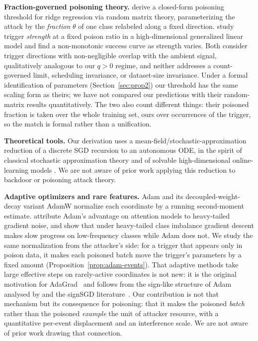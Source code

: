 \documentclass{article} %
\begin{document}
\textbf{Fraction-governed poisoning theory.} \citet{linearpoisoning2025} derive a
closed-form poisoning threshold for ridge regression via random matrix theory,
parameterizing the attack by the \emph{fraction} $\theta$ of one class relabeled along a
fixed direction. \citet{glmbackdoor2026} study trigger \emph{strength} at a fixed
poison ratio in a high-dimensional generalized linear model and find a non-monotonic
success curve as strength varies. Both consider trigger directions with non-negligible
overlap with the ambient signal, qualitatively analogous to our $q>0$ regime, and
neither addresses a count-governed limit, scheduling invariance, or dataset-size
invariance. Under a formal identification of parameters (Section~\ref{sec:prop2}) our threshold has the same scaling form as theirs; we have not compared our predictions with their random-matrix results quantitatively. The two also count different things: their poisoned fraction is taken over the whole training set, ours over occurrences of the trigger, so the match is formal rather than a unification.

\textbf{Theoretical tools.} Our derivation uses a mean-field/stochastic-approximation
reduction of a discrete SGD recursion to an autonomous ODE, in the spirit of classical
stochastic approximation theory \citep{robbinsmonro1951,benveniste1990} and of
solvable high-dimensional online-learning models
\citep{goldt2019dynamics,benarous2021online}. We are not aware of prior work applying
this reduction to backdoor or poisoning attack theory.

\textbf{Adaptive optimizers and rare features.} Adam \citep{kingma2015adam} and its
decoupled-weight-decay variant AdamW \citep{loshchilov2019adamw} normalize each
coordinate by a running second-moment estimate. \citet{zhang2020adaptive} attribute
Adam's advantage on attention models to heavy-tailed gradient noise, and
\citet{kunstner2024heavytailed} show that under heavy-tailed class imbalance gradient
descent makes slow progress on low-frequency classes while Adam does not. We study the
same normalization from the attacker's side: for a trigger that appears only in poison
data, it makes each poisoned batch move the trigger's parameters by a fixed amount
(Proposition~\ref{prop:adam-events}). That adaptive methods take large effective steps on rarely-active coordinates is not
new: it is the original motivation for AdaGrad~\citep{duchi2011adagrad} and follows from
the sign-like structure of Adam analysed by \citet{balles2018dissecting} and the signSGD
literature~\citep{bernstein2018signsgd}. Our contribution is not that mechanism but its
consequence for poisoning: that it makes the poisoned \emph{batch} rather than the
poisoned \emph{example} the unit of attacker resource, with a quantitative per-event
displacement and an interference scale. We are not aware of prior work drawing that
connection.
\end{document}
